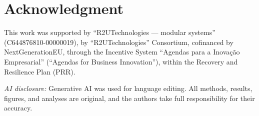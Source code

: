 \documentclass[conference,a4paper]{IEEEtran}
\begin{document}
\section*{Acknowledgment}
This work was supported by ``R2UTechnologies --- modular systems'' (C644876810-00000019), by ``R2UTechnologies'' Consortium, cofinanced by NextGenerationEU, through the Incentive System ``Agendas para a Inova\c{c}\~ao Empresarial'' (``Agendas for Business Innovation''), within the Recovery and Resilience Plan (PRR).

\textit{AI disclosure:} Generative AI was used for language editing. All methods, results, figures, and analyses are original, and the authors take full responsibility for their accuracy.


\end{document}
